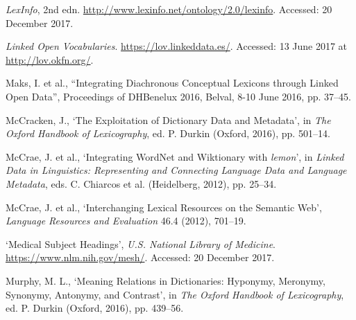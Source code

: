 \begin{list}{}
\item %
\textit{LexInfo}, 2nd edn. \url{http://www.lexinfo.net/ontology/2.0/lexinfo}. Accessed: 20 December 2017.

\item %
\textit{Linked Open Vocabularies}. \url{https://lov.linkeddata.es/}. Accessed: 13 June 2017 at \url{http://lov.okfn.org/}.

\item %
Maks, I. et al., ``Integrating Diachronous Conceptual Lexicons through Linked Open Data'', Proceedings of DHBenelux 2016, Belval, 8-10 June 2016, pp. 37–45.

\item %
McCracken, J., `The Exploitation of Dictionary Data and Metadata', in \textit{The Oxford Handbook of Lexicography}, ed. P. Durkin (Oxford, 2016), pp. 501–14.

\item %
McCrae, J. et al., `Integrating WordNet and Wiktionary with \textit{lemon}', in \textit{Linked Data in Linguistics: Representing and Connecting Language Data and Language Metadata}, eds. C. Chiarcos et al. (Heidelberg, 2012), pp. 25–34.


\item %
McCrae, J. et al., `Interchanging Lexical Resources on the Semantic Web', \textit{Language Resources and Evaluation} 46.4 (2012), 701–19.


\item %
`Medical Subject Headings', \textit{U.S. National Library of Medicine}. \url{https://www.nlm.nih.gov/mesh/}. Accessed: 20 December 2017.

\item %
Murphy, M. L., `Meaning Relations in Dictionaries: Hyponymy, Meronymy, Synonymy, Antonymy, and Contrast', in \textit{The Oxford Handbook of Lexicography}, ed. P. Durkin (Oxford, 2016), pp. 439–56.


\end{list}
